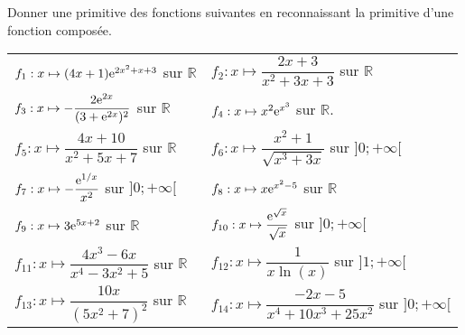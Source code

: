 \documentclass[11pt,fleqn, openany]{book} %
\begin{document}
\begin{exercise}[topic=diff02]Donner une primitive des fonctions suivantes en reconnaissant la primitive d'une fonction composée.


\renewcommand{\arraystretch}{2}
\begin{tabularx}{\linewidth}{XX}
 $f_1 : x\mapsto (4x+1)\mathrm{e}^{2x^2+x+3}$ sur $\mathbb{R}$
&
$f_2 :x\mapsto \dfrac{2x+3}{x^2+3x+3}$ sur $\mathbb{R}$
\\
$f_3:x\mapsto -\dfrac{2\mathrm{e}^{2x}}{(3+\mathrm{e}^{2x})^2}$ sur $\mathbb{R}$
&
 $f_4:x \mapsto x^2\mathrm{e}^{x^3}$ sur $\mathbb{R}$.
\\
$f_5:x \mapsto \dfrac{4x+10}{x^2+5x+7}$ sur $\mathbb{R}$
&
$f_6:x\mapsto \dfrac{x^2+1}{\sqrt{x^3+3x}}$ sur $]0;+\infty [$
\\
 $f_7:x \mapsto -\dfrac{\mathrm{e}^{1/x}}{x^2}$ sur $]0;+\infty[$
&
 $f_8:x\mapsto x\mathrm{e}^{x^2-5}$ sur $\mathbb{R}$
\\
 $f_9:x\mapsto 3\mathrm{e}^{5x+2}$ sur $\mathbb{R}$
&
$f_{10}:x \mapsto \dfrac{\mathrm{e}^{\sqrt{x}}}{\sqrt{x}}$ sur $]0;+\infty[$
\\
 $f_{11}:x\mapsto \dfrac{4x^3-6x}{x^4-3x^2+5}$ sur $\mathbb{R}$
 &
 $f_{12}:x\mapsto \dfrac{1}{x\ln(x)}$ sur $]1;+\infty[$ 
 \\
 $f_{13} : x \mapsto \dfrac{10x}{(5x^2+7)^2}$ sur $\mathbb{R}$ 
 &
 $f_{14}:x \mapsto \dfrac{-2x-5}{x^4+10x^3+25x^2}$ sur $]0;+\infty[$
 
\end{tabularx}
\newpage
\end{exercise}
\end{document}
